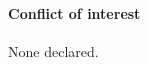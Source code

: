 \documentclass{bioinfo}
\begin{document}
 
%
%
%
%
%



\paragraph{Conflict of interest\textcolon} None declared.

 


\end{document}
